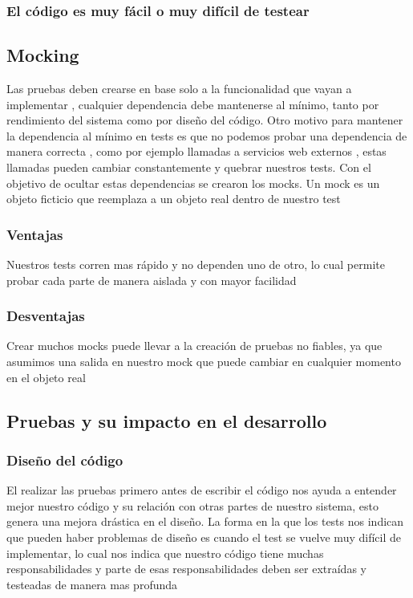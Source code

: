 \subsubsection{El código es muy fácil o muy difícil de testear}

\subsection{Mocking}
Las pruebas deben crearse en base solo a la funcionalidad que vayan a
implementar , cualquier dependencia debe mantenerse al mínimo, tanto por
rendimiento del sistema como por diseño del código. Otro motivo para mantener
la dependencia al mínimo en tests es que no podemos probar una dependencia de
manera correcta , como por ejemplo llamadas a servicios web externos , estas
llamadas pueden cambiar constantemente y quebrar nuestros tests. Con el objetivo
de ocultar estas dependencias se crearon los mocks.  Un mock es un objeto
ficticio que reemplaza a un objeto real dentro de nuestro test

\subsubsection{Ventajas}
Nuestros tests corren mas rápido y no dependen uno de otro, lo cual permite
probar cada parte de manera aislada y con mayor facilidad

\subsubsection{Desventajas}
Crear muchos mocks puede llevar a la creación de pruebas no fiables, ya que
asumimos una salida en nuestro mock que puede cambiar en cualquier momento en
el objeto real

\subsection{Pruebas y su impacto en el desarrollo}

\subsubsection{Diseño del código}
El realizar las pruebas primero antes de escribir el código nos ayuda a
entender mejor nuestro código y su relación con otras partes de nuestro
sistema, esto genera una mejora drástica en el diseño. La forma en la que los
tests nos indican que pueden haber problemas de diseño es cuando el test se
vuelve muy difícil de implementar, lo cual nos indica que nuestro código tiene
muchas responsabilidades y parte de esas responsabilidades deben ser extraídas
y testeadas de manera mas profunda

